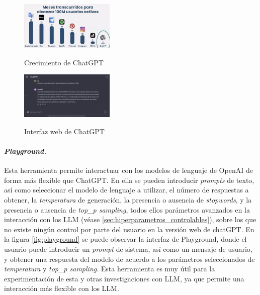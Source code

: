        \begin{figure}[h]
            \caption[Crecimiento de ChatGPT]{Crecimiento de ChatGPT}
            \centering
            \includegraphics[width=0.4\textwidth]{./figuras/100millonesUsuariosChatgpt.jpeg}
            \label{fig:crecimiento_chatgpt}
        \end{figure}

        \begin{figure}[h]
            \caption[Interfaz web de ChatGPT]{Interfaz web de ChatGPT}
            \centering
            \includegraphics[width=0.4\textwidth]{./figuras/interfaz_chatgpt.png}
            \label{fig:chatgpt}
        \end{figure}

        \paragraph{\textit{Playground.}} Esta herramienta permite interactuar con los modelos de lenguaje de OpenAI de forma más flexible que ChatGPT. En ella se pueden introducir \textit{prompts} de texto, así como seleccionar el modelo de lenguaje a utilizar, el número de respuestas a obtener, la \textit{temperatura} de generación, la presencia o ausencia de \textit{stopwords}, y la presencia o ausencia de \textit{top\_p sampling}, todos ellos parámetros avanzados en la interacción con los LLM (véase \ref{sec:hiperparametros_controlables}), sobre los que no existe ningún control por parte del usuario en la versión web de chatGPT. En la figura \ref{fig:playground} se puede observar la interfaz de Playground, donde el usuario puede introducir un \textit{prompt} de sistema, así como un mensaje de usuario, y obtener una respuesta del modelo de acuerdo a los parámetros seleccionados de \textit{temperatura} y \textit{top\_p sampling}. Esta herramienta es muy útil para la experimentación de esta y otras investigaciones con LLM, ya que permite una interacción más flexible con los LLM.

